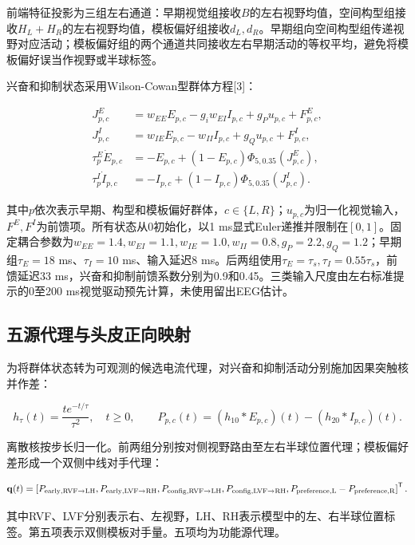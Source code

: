 前端特征投影为三组左右通道：早期视觉组接收\(B\)的左右视野均值，空间构型组接收\(H_L+H_R\)的左右视野均值，模板偏好组接收\(d_L,d_R\)。早期组向空间构型组传递视野对应活动；模板偏好组的两个通道共同接收左右早期活动的等权平均，避免将模板偏好误当作视野或半球标签。

兴奋和抑制状态采用Wilson-Cowan型群体方程{[}3{]}：

\[
\begin{aligned}
J^E_{p,c}&=w_{EE}E_{p,c}-g_iw_{EI}I_{p,c}+g_Pu_{p,c}+F^E_{p,c},\\
J^I_{p,c}&=w_{IE}E_{p,c}-w_{II}I_{p,c}+g_Qu_{p,c}+F^I_{p,c},\\
\tau^E_p\dot E_{p,c}&=-E_{p,c}+(1-E_{p,c})\Phi_{5,0.35}(J^E_{p,c}),\\
\tau^I_p\dot I_{p,c}&=-I_{p,c}+(1-I_{p,c})\Phi_{5,0.35}(J^I_{p,c}).
\end{aligned}
\]

其中\(p\)依次表示早期、构型和模板偏好群体，\(c\in\{L,R\}\)；\(u_{p,c}\)为归一化视觉输入，\(F^E,F^I\)为前馈项。所有状态从0初始化，以1 ms显式Euler递推并限制在\([0,1]\)。固定耦合参数为\(w_{EE}=1.4,w_{EI}=1.1,w_{IE}=1.0,w_{II}=0.8,g_P=2.2,g_Q=1.2\)；早期组\(\tau_E=18\) ms、\(\tau_I=10\) ms、输入延迟8 ms。后两组使用\(\tau_E=\tau_s,\tau_I=0.55\tau_s\)，前馈延迟33 ms，兴奋和抑制前馈系数分别为0.9和0.45。三类输入尺度由左右标准提示的0至200 ms视觉驱动预先计算，未使用留出EEG估计。

\hypertarget{ux4e94ux6e90ux4ee3ux7406ux4e0eux5934ux76aeux6b63ux5411ux6620ux5c04}{%
\subsection{五源代理与头皮正向映射}\label{ux4e94ux6e90ux4ee3ux7406ux4e0eux5934ux76aeux6b63ux5411ux6620ux5c04}}

为将群体状态转为可观测的候选电流代理，对兴奋和抑制活动分别施加因果突触核并作差：

\[
h_\tau(t)=\frac{t e^{-t/\tau}}{\tau^2},\quad t\ge0,\qquad
P_{p,c}(t)=(h_{10}*E_{p,c})(t)-(h_{20}*I_{p,c})(t).
\]

离散核按步长归一化。前两组分别按对侧视野路由至左右半球位置代理；模板偏好差形成一个双侧中线对手代理：

\[
\mathbf q(t)=\left[
P_{\rm early,RVF\to LH},P_{\rm early,LVF\to RH},
P_{\rm config,RVF\to LH},P_{\rm config,LVF\to RH},
P_{\rm preference,L}-P_{\rm preference,R}
\right]^{\mathsf T}.
\]

其中RVF、LVF分别表示右、左视野，LH、RH表示模型中的左、右半球位置标签。第五项表示双侧模板对手量。五项均为功能源代理。

